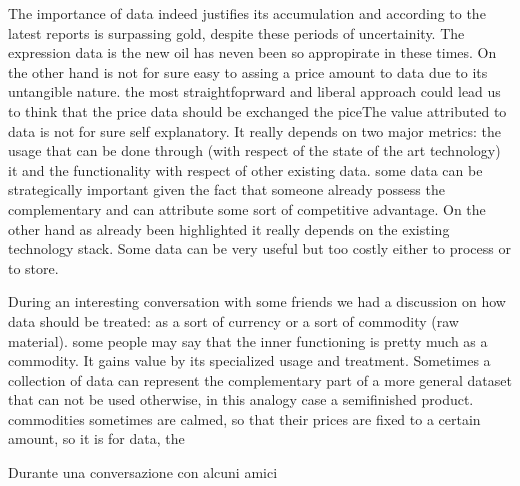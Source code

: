 \documentclass[
  12pt,
  a4paper,
  oneside]{book}
\begin{document}
The importance of data indeed justifies its accumulation and according to the latest reports is surpassing gold, despite these periods of uncertainity. The expression data is the new oil has neven been so appropirate in these times.
On the other hand is not for sure easy to assing a price amount to data due to its untangible nature.
the most straightfoprward and liberal approach could lead us to think that the price data should be exchanged the piceThe value attributed to data is not for sure self explanatory. It really depends on two major metrics: the usage that can be done through (with respect of the state of the art technology) it and the functionality with respect of other existing data. some data can be strategically important given the fact that someone already possess the complementary and can attribute some sort of competitive advantage. On the other hand as already been highlighted it really depends on the existing technology stack. Some data can be very useful but too costly either to process or to store.

During an interesting conversation with some friends we had a discussion on how data should be treated: as a sort of currency or a sort of commodity (raw material).
some people may say that the inner functioning is pretty much as a commodity. It gains value by its specialized usage and treatment. Sometimes a collection of data can represent the complementary part of a more general dataset that can not be used otherwise, in this analogy case a semifinished product. commodities sometimes are calmed, so that their prices are fixed to a certain amount, so it is for data, the

Durante una conversazione con alcuni amici
\end{document}
